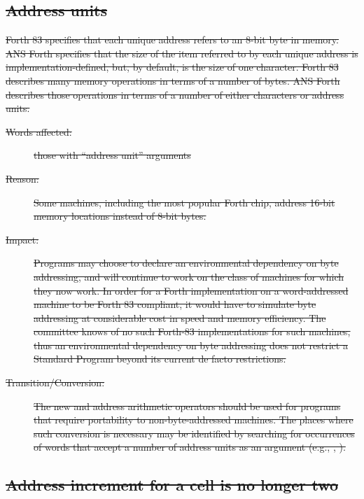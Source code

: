 \subsection[Address units]{\sout{Address units}} %

\sout{%
Forth 83 specifies that each unique address refers to an 8-bit byte
in memory. ANS Forth specifies that the size of the item referred to
by each unique address is implementation-defined, but, by default,
is the size of one character. Forth 83 describes many memory
operations in terms of a number of bytes. ANS Forth describes those
operations in terms of a number of either characters or address
units.}

\begin{description}
\item[\sout{Words affected:}]
	\sout{those with ``address unit'' arguments}

\item[\sout{Reason:}]
\sout{%
	Some machines, including the most popular Forth chip, address
	16-bit memory locations instead of 8-bit bytes.}

\item[\sout{Impact:}]
\sout{%
	Programs may choose to declare an environmental dependency on
	byte addressing, and will continue to work on the class of
	machines for which they now work. In order for a Forth
	implementation on a word-addressed machine to be Forth 83
	compliant, it would have to simulate byte addressing at
	considerable cost in speed and memory efficiency. The committee
	knows of no such Forth-83 implementations for such machines,
	thus an environmental dependency on byte addressing does not
	restrict a Standard Program beyond its current de facto
	restrictions.}

\item[\sout{Transition/Conversion:}]
\sout{%
	The new  and  address arithmetic operators
	should be used for programs that require portability to
	non-byte-addressed machines. The places where such conversion is
	necessary may be identified by searching for occurrences of words
	that accept a number of address units as an argument (e.g.,
	, ).}
\end{description}

\subsection[Address increment for a cell is no longer two]{\sout{Address increment for a cell is no longer two}} %

